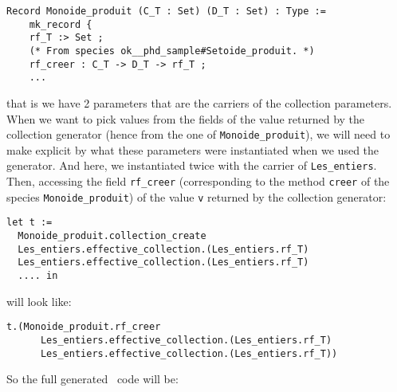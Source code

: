 {\footnotesize
\begin{lstlisting}[language=MyCoq]
  Record Monoide_produit (C_T : Set) (D_T : Set) : Type :=
    mk_record {
    rf_T :> Set ;
    (* From species ok__phd_sample#Setoide_produit. *)
    rf_creer : C_T -> D_T -> rf_T ;
    ...
\end{lstlisting}}

that is we have 2 parameters that are the carriers of the collection
parameters. When we want to pick values from the fields of the value
returned by the collection generator (hence from the one of
{\tt Monoide\_produit}), we will need to make explicit by what these
parameters were instantiated when we used the generator. And here, we
instantiated twice with the carrier of {\tt Les\_entiers}.
Then, accessing the field {\tt rf\_creer} (corresponding to the method
{\tt creer} of the species {\tt Monoide\_produit}) of the value
{\tt v} returned by the collection generator:

{\footnotesize
\begin{lstlisting}[language=MyCoq]
let t :=
  Monoide_produit.collection_create
  Les_entiers.effective_collection.(Les_entiers.rf_T)
  Les_entiers.effective_collection.(Les_entiers.rf_T)
  .... in
\end{lstlisting}}

\noindent will look like:

{\footnotesize
\begin{lstlisting}[language=MyCoq]
 t.(Monoide_produit.rf_creer
      Les_entiers.effective_collection.(Les_entiers.rf_T)
      Les_entiers.effective_collection.(Les_entiers.rf_T))
\end{lstlisting}}

So the full generated \coq\ code will be:

